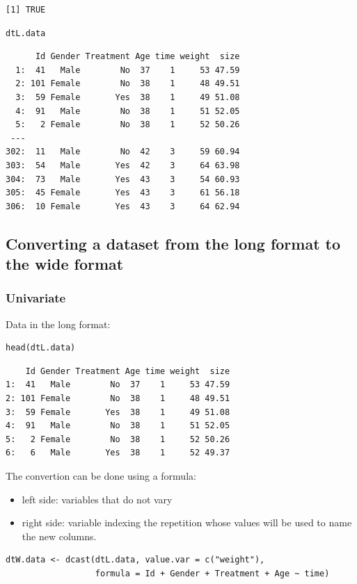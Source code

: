 \documentclass{article}
\begin{document}
\begin{verbatim}
[1] TRUE
\end{verbatim}

\lstset{language=r,label= ,caption= ,captionpos=b,numbers=none}
\begin{lstlisting}
dtL.data
\end{lstlisting}

\begin{verbatim}
      Id Gender Treatment Age time weight  size
  1:  41   Male        No  37    1     53 47.59
  2: 101 Female        No  38    1     48 49.51
  3:  59 Female       Yes  38    1     49 51.08
  4:  91   Male        No  38    1     51 52.05
  5:   2 Female        No  38    1     52 50.26
 ---                                           
302:  11   Male        No  42    3     59 60.94
303:  54   Male       Yes  42    3     64 63.98
304:  73   Male       Yes  43    3     54 60.93
305:  45 Female       Yes  43    3     61 56.18
306:  10 Female       Yes  43    3     64 62.94
\end{verbatim}

\subsection{Converting a dataset from the long format to the wide format}
\label{sec:org61eff2c}

\subsubsection{Univariate}
\label{sec:org3079e9d}
Data in the long format:
\lstset{language=r,label= ,caption= ,captionpos=b,numbers=none}
\begin{lstlisting}
head(dtL.data)
\end{lstlisting}

\begin{verbatim}
    Id Gender Treatment Age time weight  size
1:  41   Male        No  37    1     53 47.59
2: 101 Female        No  38    1     48 49.51
3:  59 Female       Yes  38    1     49 51.08
4:  91   Male        No  38    1     51 52.05
5:   2 Female        No  38    1     52 50.26
6:   6   Male       Yes  38    1     52 49.37
\end{verbatim}

The convertion can be done using a formula:
\begin{itemize}
\item left side: variables that do not vary
\item right side: variable indexing the repetition whose values will be
used to name the new columns.
\end{itemize}
\lstset{language=r,label= ,caption= ,captionpos=b,numbers=none}
\begin{lstlisting}
dtW.data <- dcast(dtL.data, value.var = c("weight"),
				  formula = Id + Gender + Treatment + Age ~ time)
\end{lstlisting}
\end{document}
